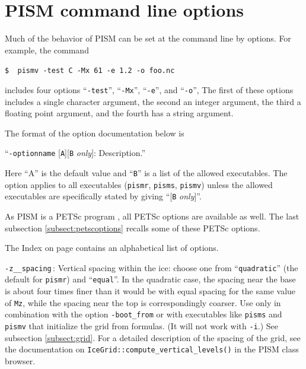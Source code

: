 \documentclass[11pt,final]{amsart}
\renewcommand{\t}[1]{\texttt{#1}}
\newcommand{\und}{\_\!\_}
\newcommand{\pismoptionindex}[1]{\index{options for PISM (and PETSc)!\texttt{-#1}}}
\newcommand{\rawopt}[1]{\vspace{1mm}\noindent \Large\texttt{-#1}\normalsize\pismoptionindex{#1}}
\newcommand{\opt}[1]{\rawopt{#1}\,:\quad}
\begin{document}
\clearpage\newpage
\section{PISM command line options}\label{sect:options}

Much of the behavior of PISM can be set at the command line by options.  For example, the command 

\verb|$  pismv -test C -Mx 61 -e 1.2 -o foo.nc|

\noindent includes four options ``\verb|-test|'', ``\verb|-Mx|'', ``\verb|-e|'', and ``\verb|-o|'',  The first of these options includes a single character argument, the second an integer argument, the third a floating point argument, and the fourth has a string argument.

The format of the option documentation below is

\centerline{``\large\texttt{-optionname} [\texttt{A}][\texttt{B} \emph{only}]: \quad Description.\normalsize''}

\noindent Here ``A'' is the default value and ``\t{B}'' is a list of the allowed executables.  The option applies to all executables (\verb|pismr|, \verb|pisms|, \verb|pismv|) unless the allowed executables are specifically stated by giving ``[\t{B} \textsl{only}]''.

As PISM is a PETSc program \cite{petsc-user-ref}, all PETSc options are available as well.  The last subsection \ref{subsect:petscoptions} recalls some of these PETSc options.

The Index on page \pageref{sect:index} contains an alphabetical list of options.








\opt{z\und spacing} Vertical spacing within the ice: choose one from ``\t{quadratic}'' (the default for \t{pismr}) and ``\t{equal}''. In the quadratic case, the spacing near the base is about four times finer than it would be with equal spacing for the same value of \verb|Mz|, while the spacing near the top is correspondingly coarser.  Use only in combination with the option \verb|-boot_from| or with executables like \verb|pisms| and \verb|pismv| that initialize the grid from formulas.  (It will not work with \verb|-i|.)  See subsection \ref{subsect:grid}.  For a detailed description of the spacing of the grid, see the documentation on \verb|IceGrid::compute_vertical_levels()| in the PISM class browser.
\end{document}
